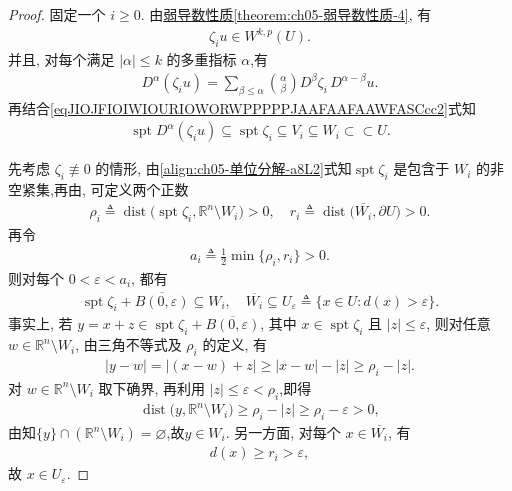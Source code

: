 \documentclass[../../main.tex]{subfiles}
\begin{document}
\begin{proof}
固定一个 $i\geqslant0$.
由\hyperref[theorem:ch05-弱导数性质-4]{弱导数性质\ref{theorem:ch05-弱导数性质-4}}, 有
\begin{align}\label{eqJIOJFIOIWIOURIOWORWPPPPPJAAFAAFAAWFASCcc1}
\zeta_i u\in W^{k,p}(U).
\end{align}
并且, 对每个满足 $|\alpha|\leqslant k$ 的多重指标 $\alpha$,有
\begin{align}\label{eqJIOJFIOIWIOURIOWORWPPPPPJAAFAAFAAWFASCcc}
D^\alpha(\zeta_i u)
=\sum\limits_{\beta\leqslant\alpha}
\binom{\alpha}{\beta}
D^\beta\zeta_i\,D^{\alpha-\beta}u.
\end{align}
再结合\eqref{eqJIOJFIOIWIOURIOWORWPPPPPJAAFAAFAAWFASCcc2}式知
\begin{align}\label{HJIOJnvzcvzn}
\operatorname{spt}D^\alpha(\zeta_i u)\subseteq \operatorname{spt}\zeta_i\subseteq V_i\subseteq W_i\subset \subset U.
\end{align}

先考虑 $\zeta_i\not\equiv0$ 的情形, 由\eqref{align:ch05-单位分解-a8L2}式知$\operatorname{spt}\zeta_i$ 是包含于 $W_i$ 的非空紧集,再由, 可定义两个正数
\begin{align*}
\rho_i
\triangleq\operatorname{dist}
\bigl(\operatorname{spt}\zeta_i,\mathbb{R}^n\setminus W_i\bigr)>0,\quad
r_i
\triangleq\operatorname{dist}
\bigl(\overline{W_i},\partial U\bigr)>0.
\end{align*}
再令
\begin{align*}
a_i\triangleq\frac{1}{2}\min\{\rho_i,r_i\}>0.
\end{align*}
则对每个 $0<\varepsilon<a_i$, 都有
\begin{align}\label{eq::JIJOWNVNZNJCS}
\operatorname{spt}\zeta_i+\overline{B(0,\varepsilon)}\subseteq W_i,
\quad
\overline{W_i}\subseteq
U_\varepsilon
\triangleq\{x\in U:d(x)>\varepsilon\}.
\end{align}
事实上, 若 $y=x+z\in \operatorname{spt}\zeta_i+\overline{B(0,\varepsilon)}$, 其中 $x\in \operatorname{spt}\zeta_i$ 且 $|z|\leqslant\varepsilon$, 则对任意 $w\in\mathbb{R}^n\setminus W_i$, 由三角不等式及 $\rho_i$ 的定义, 有
\begin{align*}
|y-w|
=|(x-w)+z|
\geqslant|x-w|-|z|
\geqslant\rho_i-|z|.
\end{align*}
对 $w\in\mathbb{R}^n\setminus W_i$ 取下确界, 再利用 $|z|\leqslant\varepsilon<\rho_i$,即得
\begin{align*}
\operatorname{dist}
\bigl(y,\mathbb{R}^n\setminus W_i\bigr)
\geqslant\rho_i-|z|
\geqslant\rho_i-\varepsilon>0,
\end{align*}
由知$\{y\}\cap (\mathbb{R}^n\setminus W_i)=\varnothing $,故$y\in W_i$.
另一方面, 对每个 $x\in\overline{W_i}$, 有
\begin{align*}
d(x)\geqslant r_i>\varepsilon,
\end{align*}
故 $x\in U_\varepsilon$.


\end{proof}
\end{document}
